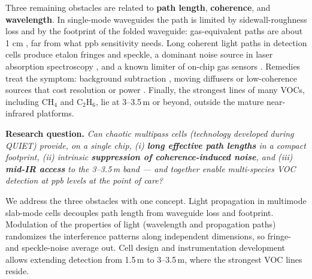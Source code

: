 \documentclass[a4paper,12pt]{article}
\begin{document}
Three remaining obstacles are related to \textbf{path length}, \textbf{coherence}, and \textbf{wavelength}. In single-mode waveguides the path is limited by sidewall-roughness loss and by the footprint of the folded waveguide: gas-equivalent paths are about 1 cm \cite{Zhao2022}, far from what ppb sensitivity needs. Long coherent light paths in detection cells produce etalon fringes and speckle, a dominant noise source in laser absorption spectroscopy \cite{Li2014}, and a known limiter of on-chip gas sensors \cite{Yan2024}. Remedies treat the symptom: background subtraction \cite{Li2014}, moving diffusers or low-coherence sources that cost resolution or power \cite{Lu2024}. Finally, the strongest lines of many VOCs, including CH$_4$ and C$_2$H$_6$, lie at 3--3.5\,\textmu{}m or beyond, outside the mature near-infrared platforms.

\textbf{Research question.} \emph{Can chaotic multipass cells (technology developed during QUIET) provide, on a single chip, (i) \textbf{long effective path lengths} in a compact footprint, (ii) intrinsic \textbf{suppression of coherence-induced noise}, and (iii) \textbf{mid-IR access} to the 3--3.5\,\textmu{}m band --- and together enable multi-species VOC detection at ppb levels at the point of care?}

We address the three obstacles with one concept. Light propagation in multimode slab-mode cells decouples path length from waveguide loss and footprint. Modulation of the properties of light (wavelength and propagation paths) randomizes the interference patterns along independent dimensions, so fringe- and speckle-noise average out. Cell design and instrumentation development allows extending detection from 1.5\,\textmu{}m to 3--3.5\,\textmu{}m, where the strongest VOC lines reside.
\end{document}
